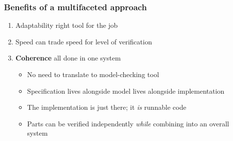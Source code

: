 \documentclass[compress,handout]{beamer}
\begin{document}
\begin{frame}
  \frametitle{Benefits of a multifaceted approach}

  \begin{enumerate}
    \item<1-> Adaptability {\textemdash} right tool for the job
    \item<2-> Speed {\textemdash} can trade speed for level of verification
    \item<3-> \textbf{Coherence} {\textemdash} all done in one system
      \begin{itemize}
        \item<4-> No need to translate to model-checking tool
        \item<5-> Specification lives alongside model lives alongside
                  implementation
        \item<6-> The implementation is just there; it \emph{is} runnable code
        \item<7-> Parts can be verified independently \emph{while} combining into an
                  overall system
      \end{itemize}
  \end{enumerate}

\end{frame}
\end{document}
